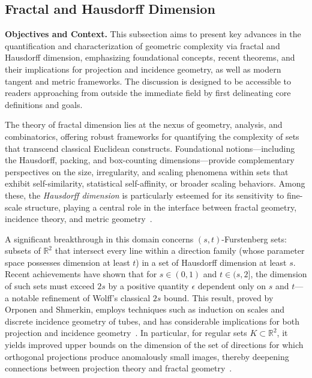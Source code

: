 \documentclass[sigconf]{acmart}
\begin{document}


\subsection{Fractal and Hausdorff Dimension}

\textbf{Objectives and Context.} This subsection aims to present key advances in the quantification and characterization of geometric complexity via fractal and Hausdorff dimension, emphasizing foundational concepts, recent theorems, and their implications for projection and incidence geometry, as well as modern tangent and metric frameworks. The discussion is designed to be accessible to readers approaching from outside the immediate field by first delineating core definitions and goals.

The theory of fractal dimension lies at the nexus of geometry, analysis, and combinatorics, offering robust frameworks for quantifying the complexity of sets that transcend classical Euclidean constructs. Foundational notions—including the Hausdorff, packing, and box-counting dimensions—provide complementary perspectives on the size, irregularity, and scaling phenomena within sets that exhibit self-similarity, statistical self-affinity, or broader scaling behaviors. Among these, the \emph{Hausdorff dimension} is particularly esteemed for its sensitivity to fine-scale structure, playing a central role in the interface between fractal geometry, incidence theory, and metric geometry~\cite{ref68}.

A significant breakthrough in this domain concerns $(s, t)$-Furstenberg sets: subsets of $\mathbb{R}^2$ that intersect every line within a direction family (whose parameter space possesses dimension at least $t$) in a set of Hausdorff dimension at least $s$. Recent achievements have shown that for $s \in (0,1)$ and $t\in(s,2]$, the dimension of such sets must exceed $2s$ by a positive quantity $\epsilon$ dependent only on $s$ and $t$—a notable refinement of Wolff's classical $2s$ bound. This result, proved by Orponen and Shmerkin, employs techniques such as induction on scales and discrete incidence geometry of tubes, and has considerable implications for both projection and incidence geometry~\cite{ref68}. In particular, for regular sets $K \subset \mathbb{R}^2$, it yields improved upper bounds on the dimension of the set of directions for which orthogonal projections produce anomalously small images, thereby deepening connections between projection theory and fractal geometry~\cite{ref68}.
\end{document}
